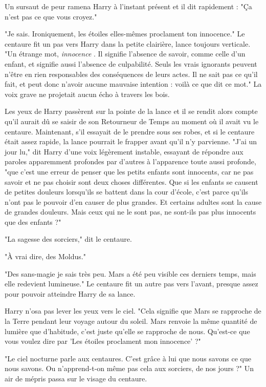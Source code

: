 Un sursaut de peur ramena Harry à l'instant présent et il dit rapidement : "Ça n'est pas ce que vous croyez."

"Je sais. Ironiquement, les étoiles elles-mêmes proclament ton innocence." Le centaure fit un pas vers Harry dans la petite clairière, lance toujours verticale. "Un étrange mot, \emph{innocence} . Il signifie l'absence de savoir, comme celle d'un enfant, et signifie aussi l'absence de culpabilité. Seuls les vrais ignorants peuvent n'être en rien responsables des conséquences de leurs actes. Il ne sait pas ce qu'il fait, et peut donc n'avoir aucune mauvaise intention : voilà ce que dit ce mot." La voix grave ne projetait aucun écho à travers les bois.

Les yeux de Harry passèrent sur la pointe de la lance et il se rendit alors compte qu'il aurait dû se saisir de son Retourneur de Temps au moment où il avait vu le centaure. Maintenant, s'il essayait de le prendre sous ses robes, et si le centaure était assez rapide, la lance pourrait le frapper avant qu'il n'y parvienne. "J'ai un jour lu," dit Harry d'une voix légèrement instable, essayant de répondre aux paroles apparemment profondes par d'autres à l'apparence toute aussi profonde, "que c'est une erreur de penser que les petits enfants sont innocents, car ne pas savoir et ne pas choisir sont deux choses différentes. Que si les enfants se causent de petites douleurs lorsqu'ils se battent dans la cour d'école, c'est parce qu'ils n'ont pas le pouvoir d'en causer de plus grandes. Et certains adultes sont la cause de grandes douleurs. Mais ceux qui ne le sont pas, ne sont-ils pas plus innocents que des enfants ?"

"La sagesse des sorciers," dit le centaure.

"À vrai dire, des Moldus."

"Des sans-magie je sais très peu. Mars a été peu visible ces derniers temps, mais elle redevient lumineuse." Le centaure fit un autre pas vers l'avant, presque assez pour pouvoir atteindre Harry de sa lance.

Harry n'osa pas lever les yeux vers le ciel. "Cela signifie que Mars se rapproche de la Terre pendant leur voyage autour du soleil. Mars renvoie la même quantité de lumière que d'habitude, c'est juste qu'elle se rapproche de nous. Qu'est-ce que vous voulez dire par 'Les étoiles proclament mon innocence' ?"

"Le ciel nocturne parle aux centaures. C'est grâce à lui que nous savons ce que nous savons. Ou n'apprend-t-on même pas cela aux sorciers, de nos jours ?" Un air de mépris passa sur le visage du centaure.

